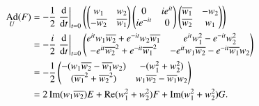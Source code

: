 \documentclass[a4paper, 12pt]{article}
\theoremstyle{Mydefinition}
\theoremstyle{Mytheorem}
\DeclareMathOperator{\Ad}{Ad}
\begin{document}
\begin{equation*}
\begin{split}
    \Ad_U(F) &= -\frac{1}{2}\left.\dv{t}\right|_{t=0}\left(\begin{pmatrix}
        w_1 & w_2 \\
        -\overline{w_2} & \overline{w_1}
    \end{pmatrix}
    \begin{pmatrix}
        0 & ie^{it}\\
        ie^{-it} & 0
    \end{pmatrix}
    \begin{pmatrix}
        \overline{w_1} & -w_2 \\
        \overline{w_2} & w_1
    \end{pmatrix}\right) \\
    &=-\frac{i}{2}\left.\dv{t}\right|_{t=0}\begin{pmatrix}
        e^{it}w_1\overline{w_2}+e^{-it}w_2\overline{w_1} & e^{it}w_1^2 - e^{-it}w_2^2\\
        -e^{it}\overline{w_2}^2 + e^{-it}\overline{w_1}^2 & -e^{it}w_1\overline{w_2} - e^{-it}\overline{w_1}w_2
    \end{pmatrix}\\
    &=-\frac{1}{2}\begin{pmatrix}
        -(w_1\overline{w_2} - \overline{w_1}w_2) & -(w_1^2+w_2^2) \\
        (\overline{w_1}^2+\overline{w_2}^2) & w_1\overline{w_2} - \overline{w_1}w_2
    \end{pmatrix}\\
    &=2\Im(w_1\overline{w_2})E + \Re(w_1^2+w_2^2)F + \Im(w_1^2+w_2^2)G.
\end{split}
\end{equation*}
\end{document}
